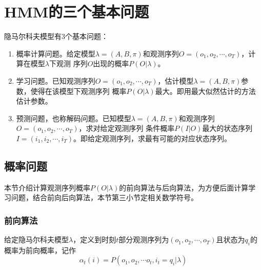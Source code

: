 \section{HMM的三个基本问题}
    隐马尔科夫模型有3个基本问题：
    \begin{enumerate}
        \item 概率计算问题。给定模型$\lambda  = \left( {A,B,\pi } \right)$和观测序列$O = ({o_1},{o_2},\cdots,{o_T})$，计算在模型$\lambda$下观测
            序列$O$出现的概率$P(O|\lambda )$。
        \item 学习问题。已知观测序列$O = ({o_1},{o_2},\cdots,{o_T})$，估计模型$\lambda  = \left( {A,B,\pi } \right)$参数，使得在该模型下观测序列
            概率$P(O|\lambda )$最大。即用最大似然估计的方法估计参数。
        \item 预测问题，也称解码问题。已知模型$\lambda  = \left( {A,B,\pi } \right)$和观测序列$O = ({o_1},{o_2},\cdots,{o_T})$，求对给定观测序列
            条件概率$P(I|O)$最大的状态序列$I = ({i_1},{i_2},\cdots,{i_T})$。即给定观测序列，求最有可能的对应状态序列。
    \end{enumerate}

    \subsection{概率问题}\label{section:probability}
    本节介绍计算观测序列概率$P(O|\lambda )$的前向算法与后向算法，为方便后面计算学习问题，结合前向后向算法，本节第三小节定相关数学符号。
        \subsubsection{前向算法}
        \begin{definition}[前向算法]
        \song 给定隐马尔科夫模型$\lambda$，定义到时刻$t$部分观测序列为$({o_1},{o_2},\cdots,{o_T})$且状态为$q_i$的概率为前向概率，记作
            \begin{equation}
            {\alpha _t}(i) = P({o_1},{o_2}, \cdots {o_t},{i_t} = {q_i}|\lambda )
            \end{equation}
        \end{definition}

